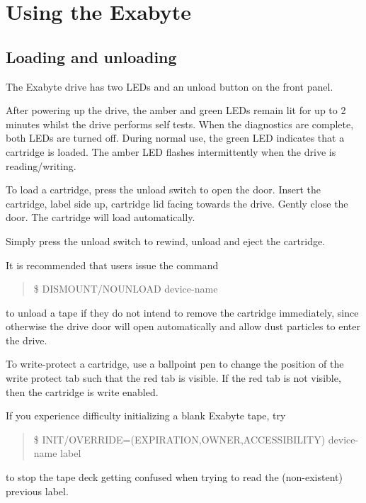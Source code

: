 \section{Using the Exabyte}

\subsection{Loading and unloading}

The Exabyte drive has two LEDs and an unload button on the front panel. 

After powering up the drive, the amber and green LEDs remain lit for
up to 2 minutes whilst the drive performs self tests. When the diagnostics are
complete, both LEDs are turned off. During normal use, the green LED indicates
that a cartridge is loaded. The amber LED flashes intermittently when 
the drive is reading/writing.

To load a cartridge, press the unload switch to open the door. Insert the
cartridge, label side up, cartridge lid facing towards the drive. 
Gently close the door. The cartridge will load automatically.

Simply press the unload switch to rewind, unload and eject the cartridge.

It is recommended that users issue the command

\begin{quote}\tt

\$ DISMOUNT/NOUNLOAD device-name

\end{quote}

to unload a tape if they do not intend to remove the cartridge immediately,
since otherwise the drive door will open automatically and allow dust 
particles to enter the drive.

To write-protect a cartridge, use a ballpoint pen to change the
position of the write protect tab such that the red tab is visible.
If the red tab is not visible, then the cartridge is write enabled.

If you experience difficulty initializing a blank Exabyte tape, try

\begin{quote}\tt

\$ INIT/OVERRIDE=(EXPIRATION,OWNER,ACCESSIBILITY) device-name label

\end{quote}

to stop the tape deck getting confused when trying to read the 
(non-existent) previous label.

